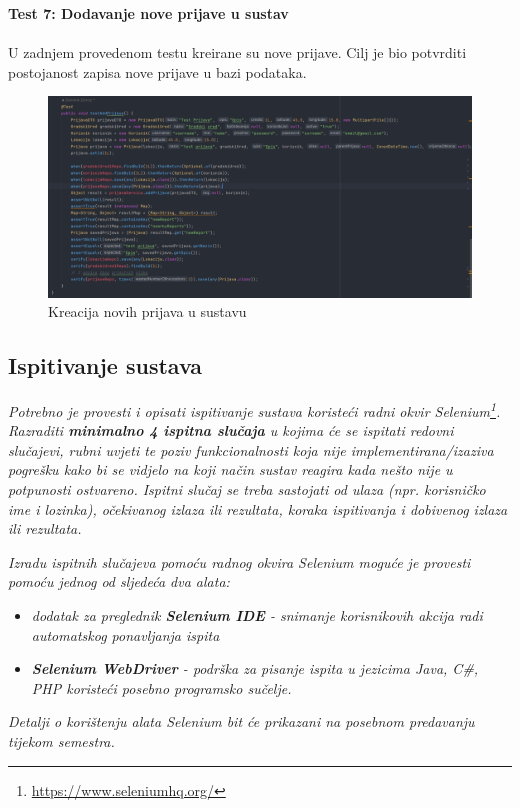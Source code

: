 		\textbf{Test 7: Dodavanje nove prijave u sustav}\\
			\\ U zadnjem provedenom testu kreirane su nove prijave. Cilj je bio potvrditi postojanost zapisa nove prijave u bazi podataka.
			
			\begin{figure}[H]
			\includegraphics[scale=0.5]{slike/addPrijava.PNG} %
			\centering
			\caption{Kreacija novih prijava u sustavu}
			\label{fig:implementacija}
		\end{figure}
			
			
			
			\subsection{Ispitivanje sustava}
			
			 \textit{Potrebno je provesti i opisati ispitivanje sustava koristeći radni okvir Selenium\footnote{\url{https://www.seleniumhq.org/}}. Razraditi \textbf{minimalno 4 ispitna slučaja} u kojima će se ispitati redovni slučajevi, rubni uvjeti te poziv funkcionalnosti koja nije implementirana/izaziva pogrešku kako bi se vidjelo na koji način sustav reagira kada nešto nije u potpunosti ostvareno. Ispitni slučaj se treba sastojati od ulaza (npr. korisničko ime i lozinka), očekivanog izlaza ili rezultata, koraka ispitivanja i dobivenog izlaza ili rezultata.\\ }
			 
			 \textit{Izradu ispitnih slučajeva pomoću radnog okvira Selenium moguće je provesti pomoću jednog od sljedeća dva alata:}
			 \begin{itemize}
			 	\item \textit{dodatak za preglednik \textbf{Selenium IDE} - snimanje korisnikovih akcija radi automatskog ponavljanja ispita	}
			 	\item \textit{\textbf{Selenium WebDriver} - podrška za pisanje ispita u jezicima Java, C\#, PHP koristeći posebno programsko sučelje.}
			 \end{itemize}
		 	\textit{Detalji o korištenju alata Selenium bit će prikazani na posebnom predavanju tijekom semestra.}
			
